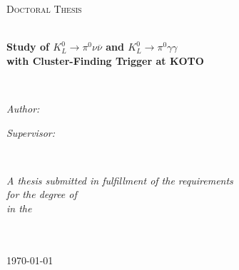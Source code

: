 \documentclass[
11pt, %
english, %
singlespacing, %
nolistspacing, %
liststotoc, %
toctotoc, %
parskip, %
headsepline, %
consistentlayout, %
]{MastersDoctoralThesis} %
\begin{document}
\begin{titlepage}
\begin{center}

\vspace*{.06\textheight}
{\scshape\LARGE \univname\par}\vspace{1.5cm} %
\textsc{\Large Doctoral Thesis}\\[0.5cm] %

\HRule \\[0.4cm] %
{\huge \bfseries {Study of $K_L^0\to\pi^0\nu\overline{\nu}$ and $K_L^0\to\pi^0\gamma\gamma$ \\ with Cluster-Finding Trigger at KOTO} \par}\vspace{0.4cm} %
\HRule \\[1.5cm] %
 
\begin{minipage}[t]{0.4\textwidth}
\begin{flushleft} \large
\emph{Author:}\\
\href{http://www.johnsmith.com}{\authorname} %
\end{flushleft}
\end{minipage}
\begin{minipage}[t]{0.4\textwidth}
\begin{flushright} \large
\emph{Supervisor:} \\
\href{http://www.jamessmith.com}{\supname} %
\end{flushright}
\end{minipage}\\[3cm]
 
\vfill

\large \textit{A thesis submitted in fulfillment of the requirements\\ for the degree of \degreename}\\[0.3cm] %
\textit{in the}\\[0.4cm]
\groupname\\\deptname\\[2cm] %
 
\vfill

{\large \today}\\[4cm] %
 
\vfill
\end{center}
\end{titlepage}
\end{document}
